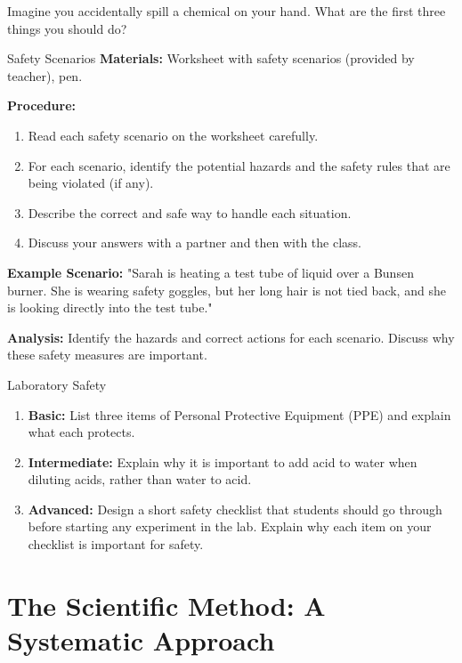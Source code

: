 \begin{stopandthink}
Imagine you accidentally spill a chemical on your hand. What are the first three things you should do?
\end{stopandthink}

\begin{investigation}{Safety Scenarios}
\textbf{Materials:}  Worksheet with safety scenarios (provided by teacher), pen.

\textbf{Procedure:}
\begin{enumerate}
    \item Read each safety scenario on the worksheet carefully.
    \item For each scenario, identify the potential hazards and the safety rules that are being violated (if any).
    \item Describe the correct and safe way to handle each situation.
    \item Discuss your answers with a partner and then with the class.
\end{enumerate}

\textbf{Example Scenario:}  "Sarah is heating a test tube of liquid over a Bunsen burner. She is wearing safety goggles, but her long hair is not tied back, and she is looking directly into the test tube."

\textbf{Analysis:} Identify the hazards and correct actions for each scenario. Discuss why these safety measures are important.
\end{investigation}

\begin{tieredquestions}{Laboratory Safety}
\begin{enumerate}
    \item \textbf{Basic:} List three items of Personal Protective Equipment (PPE) and explain what each protects.
    \item \textbf{Intermediate:} Explain why it is important to add acid to water when diluting acids, rather than water to acid.
    \item \textbf{Advanced:}  Design a short safety checklist that students should go through before starting any experiment in the lab.  Explain why each item on your checklist is important for safety.
\end{enumerate}
\end{tieredquestions}

\section{The Scientific Method: A Systematic Approach}

